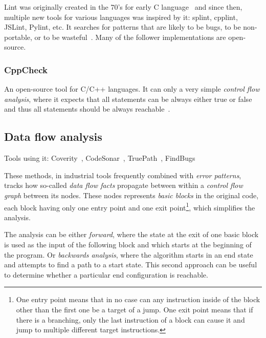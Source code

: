 Lint was originally created in the 70's for early C language~\cite[Chap. 2.2]{KrenaVojnarOverview} and since then, multiple new tools for various languages was inspired by it: splint, cpplint, JSLint, Pylint, etc. It searches for patterns that are likely to be bugs, to be non-portable, or to be wasteful~\cite{lintMan}. Many of the follower implementations are open-source.

\subsubsection{CppCheck}

An open-source tool for C/C++ languages. It can only a very simple {\em control flow analysis}, where it expects that all statements can be always either true or false and thus all statements should be always reachable~\cite{cppcheckDesign}.

\subsection{Data flow analysis}

Tools using it: Coverity~\cite{KrenaVojnarOverview}, CodeSonar~\cite{KrenaVojnarOverview}, TruePath~\cite{KrenaVojnarOverview}, FindBugs~\cite{KrenaVojnarOverview}

These methods, in industrial tools frequently combined with {\em error patterns}, tracks how so-called {\em data flow facts} propagate between within a {\em control flow graph} between its nodes. These nodes represents {\em basic blocks} in the original code, each block having only one entry point and one exit point\footnote{One entry point means that in no case can any instruction inside of the block other than the first one be a target of a jump. One exit point means that if there is a branching, only the last instruction of a block can cause it and jump to multiple different target instructions.}, which simplifies the analysis.

The analysis can be either {\em forward}, where the state at the exit of one basic block is used as the input of the following block and which starts at the beginning of the program. Or {\em backwards analysis}, where the algorithm starts in an end state and attempts to find a path to a start state. This second approach can be useful to determine whether a particular end configuration is reachable.

